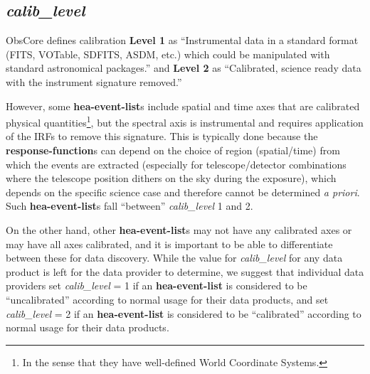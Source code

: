 \documentclass[11pt,a4paper]{ivoa}
\newcommand{\TODO}[1]{%
    \noindent%
    \colorbox{green}{%
            \parbox{0.85\linewidth}{\sffamily \textbf{TODO:}\\
            #1}
    }%
    \vspace{2pt}
}
\begin{document}

\subsection{{\em calib\_level}}

ObsCore defines calibration {\bf Level 1} as ``Instrumental data in a standard format (FITS, VOTable, SDFITS, ASDM, etc.) which could be manipulated with standard astronomical packages.'' and {\bf Level 2} as ``Calibrated, science ready data with the instrument signature removed.''

However, some {\bf hea-event-list}s include spatial and time axes that are calibrated physical quantities\footnote{In the sense that they have well-defined World Coordinate Systems.}, but the spectral axis is instrumental and requires application of the IRFs to remove this signature. This is typically done because the {\bf response-function}s can depend on the choice of region (spatial/time) from which the events are extracted (especially for telescope/detector combinations where the telescope position dithers on the sky during the exposure), which depends on the specific science case and therefore cannot be determined {\em a priori\/}.  Such {\bf hea-event-list}s fall ``between'' {\em calib\_level\/} 1 and 2.

On the other hand, other {\bf hea-event-list}s may not have any calibrated axes or may have all axes calibrated, and it is important to be able to differentiate between these for data discovery.  While the value for {\em calib\_level\/} for any data product is left for the data provider to determine, we suggest that individual data providers set {\em calib\_level\/} = 1 if an {\bf hea-event-list} is considered to be ``uncalibrated'' according to normal usage for their data products, and set {\em calib\_level\/} = 2 if an {\bf hea-event-list} is considered to be ``calibrated'' according to normal usage for their data products.
\end{document}
